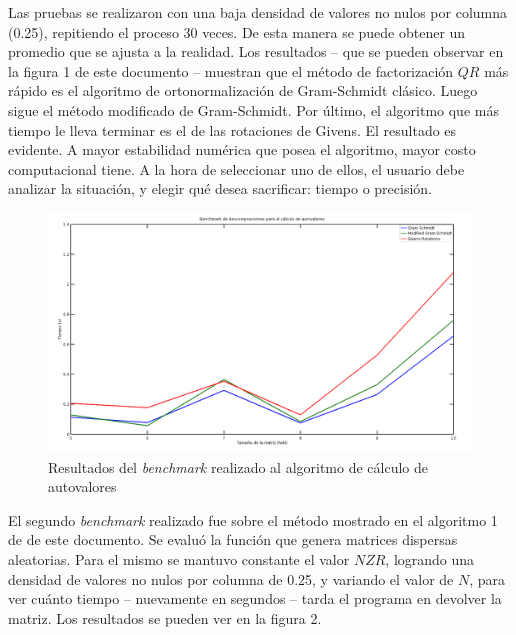 \documentclass[spanish]{article}
\begin{document}
    \par Las pruebas se realizaron con una baja densidad de valores no nulos por columna (0.25), repitiendo el proceso 30 veces. De esta manera se puede obtener un promedio que se ajusta a la realidad. Los resultados – que se pueden observar en la figura 1 de este documento – muestran que el método de factorización $QR$ más rápido es el algoritmo de ortonormalización de Gram-Schmidt clásico. Luego sigue el método modificado de Gram-Schmidt. Por último, el algoritmo que más tiempo le lleva terminar es el de las rotaciones de Givens. El resultado es evidente. A mayor estabilidad numérica que posea el algoritmo, mayor costo computacional tiene. A la hora de seleccionar uno de ellos, el usuario debe analizar la situación, y elegir qué desea sacrificar: tiempo o precisión.
    
    \begin{figure}[H]
        \centering
        \includegraphics[scale=0.22]{./ben3.png}
        \caption{Resultados del \textit{benchmark} realizado al algoritmo de cálculo de autovalores}
    \end{figure}
    
    \vspace{5mm}
     
    \par El segundo \textit{benchmark} realizado fue sobre el método mostrado en el algoritmo 1 de de este documento. Se evaluó la función que genera matrices dispersas aleatorias. Para el mismo se mantuvo constante el valor $NZR$, logrando una densidad de valores no nulos por columna de 0.25, y variando el valor de $N$, para ver cuánto tiempo – nuevamente en segundos – tarda el programa en devolver la matriz. Los resultados se pueden ver en la figura 2.
    
\end{document}
